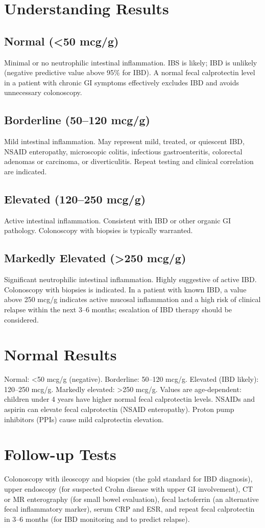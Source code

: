 \section*{Understanding Results}
\subsection*{Normal (<50 mcg/g)}
Minimal or no neutrophilic intestinal inflammation. IBS is likely; IBD is unlikely (negative predictive value above 95\% for IBD). A normal fecal calprotectin level in a patient with chronic GI symptoms effectively excludes IBD and avoids unnecessary colonoscopy.
\subsection*{Borderline (50--120 mcg/g)}
Mild intestinal inflammation. May represent mild, treated, or quiescent IBD, NSAID enteropathy, microscopic colitis, infectious gastroenteritis, colorectal adenomas or carcinoma, or diverticulitis. Repeat testing and clinical correlation are indicated.
\subsection*{Elevated (120--250 mcg/g)}
Active intestinal inflammation. Consistent with IBD or other organic GI pathology. Colonoscopy with biopsies is typically warranted.
\subsection*{Markedly Elevated (>250 mcg/g)}
Significant neutrophilic intestinal inflammation. Highly suggestive of active IBD. Colonoscopy with biopsies is indicated. In a patient with known IBD, a value above 250 mcg/g indicates active mucosal inflammation and a high risk of clinical relapse within the next 3--6 months; escalation of IBD therapy should be considered.

\section*{Normal Results}
Normal: <50 mcg/g (negative). Borderline: 50--120 mcg/g. Elevated (IBD likely): 120--250 mcg/g. Markedly elevated: >250 mcg/g. Values are age-dependent: children under 4 years have higher normal fecal calprotectin levels. NSAIDs and aspirin can elevate fecal calprotectin (NSAID enteropathy). Proton pump inhibitors (PPIs) cause mild calprotectin elevation.

\section*{Follow-up Tests}
Colonoscopy with ileoscopy and biopsies (the gold standard for IBD diagnosis), upper endoscopy (for suspected Crohn disease with upper GI involvement), CT or MR enterography (for small bowel evaluation), fecal lactoferrin (an alternative fecal inflammatory marker), serum CRP and ESR, and repeat fecal calprotectin in 3--6 months (for IBD monitoring and to predict relapse).


